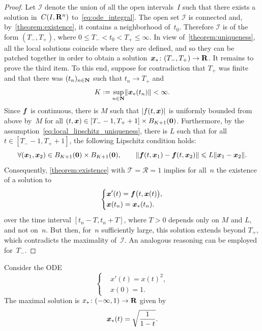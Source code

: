 \begin{proof}
    Let $\mathcal I$ denote the union of all the open intervals~$I$ such that there exists a solution in~$C(I, \mathbf R^n)$ to~\eqref{eq:ode_integral}.
    The open set $\mathcal I$ is connected and, by~\cref{theorem:existence},
    it contains a neighborhood of~$t_0$.
    Therefore $\mathcal I$ is of the form $(T_-, T_+)$,
    where $0 \leq T_- <  t_0 < T_+ \leq \infty$.
    In view of~\cref{theorem:uniqueness},
    all the local solutions coincide where they are defined,
    and so they can be patched together in order to obtain a solution~$\mathbf{\boldsymbol{x}}_*\colon (T_-, T_+) \to \mathbf R$.
    It remains to prove the third item.
    To this end, suppose for contradiction that $T_+$ was finite and that
    there was $(t_n)_{n \in \mathbf N}$ such that $t_n \to T_+$ and~
    \[
        K := \sup_{n \in \mathbf N} \lVert\mathbf{\boldsymbol{x}}_*(t_n)\rVert < \infty.
    \]
    Since $\mathbf{\boldsymbol{f}}$ is continuous,
    there is $M$ such that $\lvert f(t, \mathbf{\boldsymbol{x}}) \rvert$ is uniformly bounded from above by~$M$ for all $(t, \mathbf{\boldsymbol{x}}) \in [T_- - 1, T_+ + 1] \times B_{K+1}(\mathbf{\boldsymbol{0}})$.
    Furthermore, by the assumption~\eqref{eq:local_lipschitz_uniqueness},
    there is $L$ such that for all $t \in [T_- - 1, T_+ + 1]$,
    the following Lipschitz condition holds:
    \[
        \forall (\mathbf{\boldsymbol{x}}_1, \mathbf{\boldsymbol{x}}_2) \in  B_{K+1}(\mathbf{\boldsymbol{0}}) \times B_{K+1}(\mathbf{\boldsymbol{0}}), \qquad
        \lVert \mathbf{\boldsymbol{f}}(t, \mathbf{\boldsymbol{x}}_1) - \mathbf{\boldsymbol{f}}(t, \mathbf{\boldsymbol{x}}_2) \rVert \leqslant L \lVert\mathbf{\boldsymbol{x}}_1 - \mathbf{\boldsymbol{x}}_2\rVert.
    \]
    Consequently, \cref{theorem:existence} with $\mathcal T = \mathcal R = 1$ implies for all~$n$ the existence of a solution to
    \[
        \left \{
        \begin{aligned}
            & \mathbf{\boldsymbol{x}}'(t) = \mathbf{\boldsymbol{f}}\bigl(t, \mathbf{\boldsymbol{x}}(t)\bigr), \\
            & \mathbf{\boldsymbol{x}}(t_n) = \mathbf{\boldsymbol{x}}_*(t_n).
        \end{aligned}
        \right.
    \]
    over the time interval $[t_n - T, t_n + T]$, where $T > 0$ depends only on $M$ and $L$, and not on~$n$.
    But then, for~$n$ sufficiently large,
    this solution extends beyond $T_+$,
    which contradicts the maximality of~$\mathcal I$.
    An analogous reasoning can be employed for~$T_-$.
\end{proof}
\begin{example}
    Consider the ODE
    \[
        \left \{
        \begin{aligned}
            & x'(t) = x(t)^2, \\
            & x(0) = 1.
        \end{aligned}
        \right.
    \]
    The maximal solution is $x_* \colon (-\infty, 1) \to \mathbf R$ given by
    \[
        \mathbf{\boldsymbol{x}}_*(t) = \sqrt{\frac{1}{1-t}}.
    \]
\end{example}

